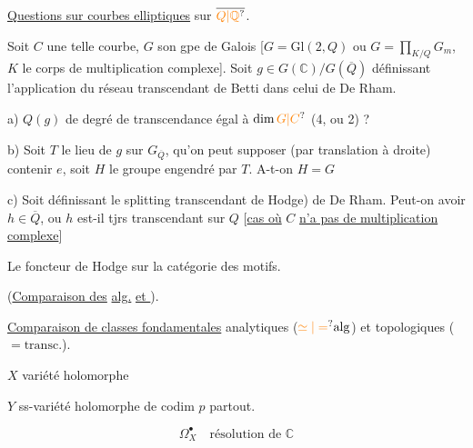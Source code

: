 \uline{Questions sur courbes elliptiques} sur $\overline{\unsure{Q|\mathbb Q}}$.

Soit $C$ une telle courbe, $G$ son gpe de Galois  [$G=\mathrm{Gl}(2,Q)$ ou $G=\prod_{K/Q}G_m$, $K$ le corps de multiplication complexe]. Soit $g\in G(\mathbb C)/G(\overline Q)$ définissant l'application du réseau transcendant de Betti dans celui de De Rham.

a) $Q(g)$ de degré de transcendance égal à $\dim\unsure{G|C}$ (4, ou 2) ?

b) Soit $T$ le lieu de $g$ sur $G_{\overline Q}$,  qu'on peut supposer (par translation à droite) contenir $e$,  soit $H$ le groupe engendré  par $T$.  A-t-on $H=G$

c) Soit  \inserted{$h\in\mathbb C/\overline Q$ [quotient additif)} définissant le splitting transcendant  de Hodge) de De Rham. Peut-on avoir $h\in\overline Q$, ou $h$ est-il tjrs transcendant sur $Q$
[\uline{cas où} $C$ \uline{n'a pas de multiplication complexe}]

Le foncteur de Hodge sur la catégorie des motifs.

(\uline{Comparaison des} \uline{ alg.} \uline{et }).

\uline{Comparaison de classes fondamentales} analytiques ($\unsure{\simeq|=} \mathrm{alg}$) et topologiques ($=\mathrm{transc.}$).

$X$ variété  holomorphe

$Y$ ss-variété holomorphe de codim $p$ partout.

\[
\Omega_X^\bullet\quad\text{résolution de }\mathbb C
\]

